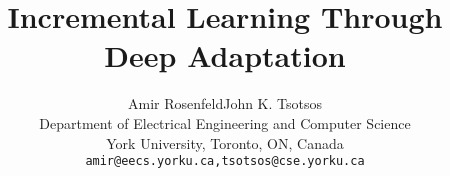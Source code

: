 \documentclass[10pt,journal,compsoc]{IEEEtran}
\begin{document}
%
\title{Incremental Learning Through Deep Adaptation}
%
%
%
%

\author{Amir Rosenfeld\qquad John K. Tsotsos\\
Department of Electrical Engineering and Computer Science\\ York University, Toronto, ON, Canada\\
\texttt{amir@eecs.yorku.ca,tsotsos@cse.yorku.ca}}



% 
%
\end{document}
